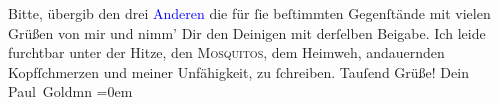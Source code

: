            \pstart
           Bitte, übergib den drei \textcolor{blue}{Anderen}{} die für ſie beſtimmten Gegenſtände
               mit vielen Grüßen von mir und nimm’ Dir \strikeout{\textcolor{gray}{d}} den Deinigen mit derſelben Beigabe.\pend
           \pstart
           Ich leide furchtbar unter der Hitze, den \textsc{Mosquitos}, dem
               Heimweh, andauernden Kopfſchmerzen und meiner Unfähigkeit, zu ſchreiben.\pend
           \pstart
           Tauſend Grüße!\pend
           \pstart
           Dein {\\[\baselineskip]}\spacefill\mbox{Paul Goldmn}\pend
           \leftskip=0em{}\endnumbering{}\begin{anhang}\end{anhang}
      